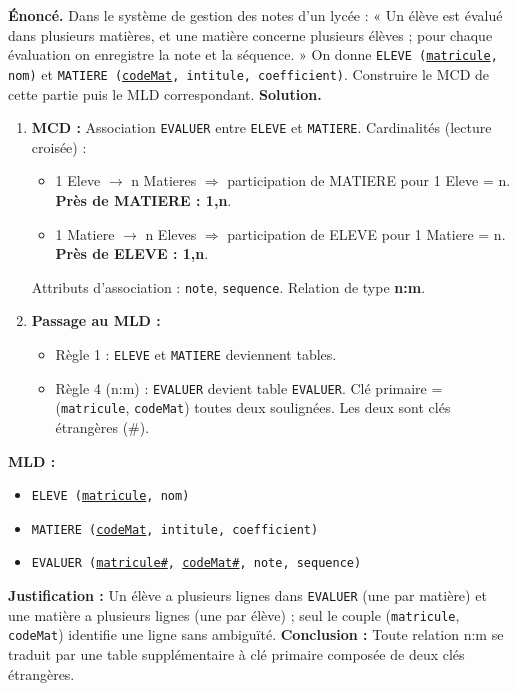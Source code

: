\documentclass[11pt]{article}
\begin{document}
\begin{exoresolu}
\textbf{Énoncé.} Dans le système de gestion des notes d'un lycée : « Un élève est évalué dans plusieurs matières, et une matière concerne plusieurs élèves ; pour chaque évaluation on enregistre la note et la séquence. » On donne \texttt{ELEVE (\underline{matricule}, nom)} et \texttt{MATIERE (\underline{codeMat}, intitule, coefficient)}. Construire le MCD de cette partie puis le MLD correspondant.
\tcblower
\textbf{Solution.}
\begin{enumerate}
\item \textbf{MCD :} Association \texttt{EVALUER} entre \texttt{ELEVE} et \texttt{MATIERE}.
Cardinalités (lecture croisée) :
\begin{itemize}
\item 1 Eleve $\to$ n Matieres $\Rightarrow$ participation de MATIERE pour 1 Eleve = n. \textbf{Près de MATIERE : 1,n}.
\item 1 Matiere $\to$ n Eleves $\Rightarrow$ participation de ELEVE pour 1 Matiere = n. \textbf{Près de ELEVE : 1,n}.
\end{itemize}
Attributs d'association : \texttt{note}, \texttt{sequence}. Relation de type \textbf{n:m}.
\item \textbf{Passage au MLD :}
\begin{itemize}
\item Règle 1 : \texttt{ELEVE} et \texttt{MATIERE} deviennent tables.
\item Règle 4 (n:m) : \texttt{EVALUER} devient table \texttt{EVALUER}. Clé primaire = (\texttt{matricule}, \texttt{codeMat}) toutes deux soulignées. Les deux sont clés étrangères (\#).
\end{itemize}
\end{enumerate}
\textbf{MLD :}
\begin{itemize}
\item \texttt{ELEVE (\underline{matricule}, nom)}
\item \texttt{MATIERE (\underline{codeMat}, intitule, coefficient)}
\item \texttt{EVALUER (\underline{matricule\#}, \underline{codeMat\#}, note, sequence)}
\end{itemize}
\textbf{Justification :} Un élève a plusieurs lignes dans \texttt{EVALUER} (une par matière) et une matière a plusieurs lignes (une par élève) ; seul le couple (\texttt{matricule}, \texttt{codeMat}) identifie une ligne sans ambiguïté.
\textbf{Conclusion :} Toute relation n:m se traduit par une table supplémentaire à clé primaire composée de deux clés étrangères.
\end{exoresolu}
\end{document}
